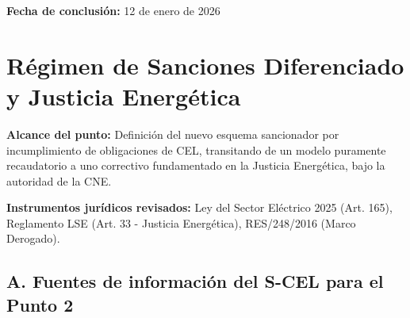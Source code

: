 \documentclass{cel}
\begin{document}
\textbf{Fecha de conclusión:} 12 de enero de 2026


{}
\section*{Régimen de Sanciones Diferenciado y Justicia Energética}
\nopagebreak

\textbf{Alcance del punto:} Definición del nuevo esquema sancionador por incumplimiento de obligaciones de CEL, transitando de un modelo puramente recaudatorio a uno correctivo fundamentado en la Justicia Energética, bajo la autoridad de la CNE.

\textbf{Instrumentos jurídicos revisados:} Ley del Sector Eléctrico 2025 (Art. 165), Reglamento LSE (Art. 33 - Justicia Energética), RES/248/2016 (Marco Derogado).


\vspace{0.4cm}
\subsection{A. Fuentes de información del S-CEL para el Punto 2}
\nopagebreak
\end{document}
